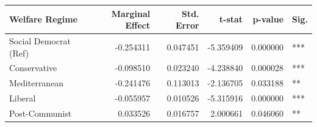 \begin{tabular}{lrrrrl}
\toprule
Welfare Regime & Marginal Effect & Std. Error & t-stat & p-value & Sig. \\
\midrule
Social Democrat (Ref) & -0.254311 & 0.047451 & -5.359409 & 0.000000 & *** \\
Conservative & -0.098510 & 0.023240 & -4.238840 & 0.000028 & *** \\
Mediterranean & -0.241476 & 0.113013 & -2.136705 & 0.033188 & ** \\
Liberal & -0.055957 & 0.010526 & -5.315916 & 0.000000 & *** \\
Post-Communist & 0.033526 & 0.016757 & 2.000661 & 0.046060 & ** \\
\bottomrule
\end{tabular}
